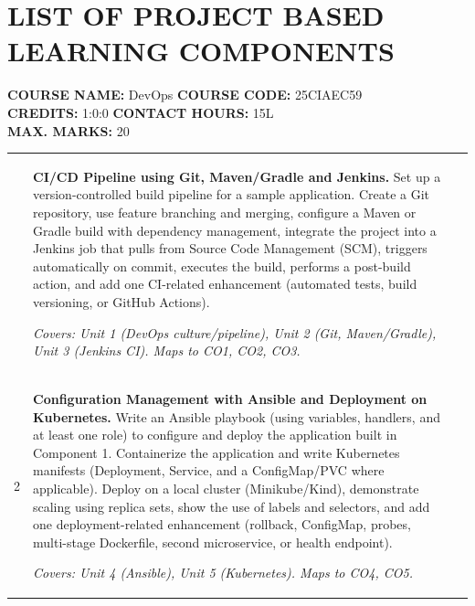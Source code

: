 \documentclass[12pt,a4paper]{article}
\newcommand{\sizeTwelve}{\fontsize{12pt}{14.5pt}\selectfont}  %
\begin{document}
\section*{LIST OF PROJECT BASED LEARNING COMPONENTS}

\noindent
{\sizeTwelve
\textbf{COURSE NAME:} DevOps \hfill \textbf{COURSE CODE:} 25CIAEC59 \\
\textbf{CREDITS:} 1:0:0 \hfill \textbf{CONTACT HOURS:} 15L \\
\textbf{MAX. MARKS:} 20
\par}

\vspace{0.6cm}

{\sizeTwelve
\setlength{\tabcolsep}{4pt}
\renewcommand{\arraystretch}{1.25}
\begin{longtable}{|>{\centering\arraybackslash}m{1.2cm}|>{\raggedright\arraybackslash}p{10.0cm}|>{\centering\arraybackslash}m{1.8cm}|}
\hline
\multicolumn{1}{|c|}{\textbf{Sl. No}} &
\multicolumn{1}{c|}{\textbf{Description}} &
\multicolumn{1}{c|}{\textbf{Marks}} \\
\hline
\endhead

1 &
\textbf{CI/CD Pipeline using Git, Maven/Gradle and Jenkins.}
Set up a version-controlled build pipeline for a sample application. Create a Git repository, use feature branching and merging, configure a Maven or Gradle build with dependency management, integrate the project into a Jenkins job that pulls from Source Code Management (SCM), triggers automatically on commit, executes the build, performs a post-build action, and add one CI-related enhancement (automated tests, build versioning, or GitHub Actions).

\textit{Covers: Unit 1 (DevOps culture/pipeline), Unit 2 (Git, Maven/Gradle), Unit 3 (Jenkins CI). Maps to CO1, CO2, CO3.}
& 10 \\
\hline

2 &
\textbf{Configuration Management with Ansible and Deployment on Kubernetes.}
Write an Ansible playbook (using variables, handlers, and at least one role) to configure and deploy the application built in Component 1. Containerize the application and write Kubernetes manifests (Deployment, Service, and a ConfigMap/PVC where applicable). Deploy on a local cluster (Minikube/Kind), demonstrate scaling using replica sets, show the use of labels and selectors, and add one deployment-related enhancement (rollback, ConfigMap, probes, multi-stage Dockerfile, second microservice, or health endpoint).

\textit{Covers: Unit 4 (Ansible), Unit 5 (Kubernetes). Maps to CO4, CO5.}
& 10 \\
\hline

\end{longtable}
\par}
\end{document}

